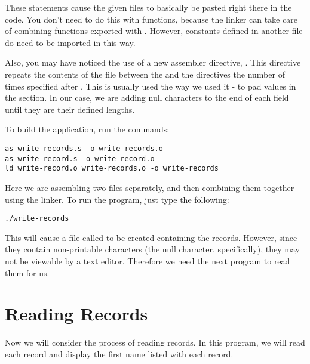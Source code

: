 These statements cause the given files to basically be pasted right there
in the code.  You don't need to do this with functions, because the
linker can take care of combining functions exported with 
.  However, constants defined in another file
do need to be imported in this way.

Also, you may have noticed the use of a new assembler directive, 
.  This directive repeats the contents of
the file between the  and the 
directives the number of times specified after .
This is usually used the way we used it - to pad values in the 
 section.  In our case, we are adding null characters
to the end of each field until they are their defined lengths.

To build the application, run the commands:

\begin{simpletyping}
\begin{lstlisting}
as write-records.s -o write-records.o
as write-record.s -o write-record.o
ld write-record.o write-records.o -o write-records
\end{lstlisting}
\end{simpletyping}

Here we are assembling two files separately, and then combining them
together using the linker.  
To run the program, just type the following:

\begin{simpletyping}
\begin{lstlisting}
./write-records
\end{lstlisting}
\end{simpletyping}

This will cause a file called  to be created 
containing the records.  However, since they contain non-printable characters
(the null character, specifically), they may not be viewable by a text 
editor.  Therefore we need the next program to read them for us.

\section{Reading Records}

Now we will consider the process of reading records.  In this 
program, we will read each record and display the first name listed
with each record.

